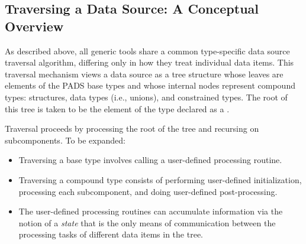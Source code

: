 \subsection{Traversing a Data Source: A Conceptual Overview}
\label{sec:gen-tool-traversal}
As described above, all generic tools share a common type-specific data source traversal algorithm, differing only in how they treat individual data items. This traversal mechanism views a data source as a tree structure whose leaves are elements of the PADS base types and whose internal nodes represent compound types: structures, data types (i.e., unions), and constrained types. The root of this tree is taken to be the element of the type declared as a .

Traversal proceeds by processing the root of the tree and recursing on subcomponents. To be expanded:
\begin{itemize}
\item Traversing a base type involves calling a user-defined processing routine.
\item Traversing a compound type consists of performing user-defined initialization, processing each subcomponent, and doing user-defined post-processing.
\item The user-defined processing routines can accumulate information via the notion of a \emph{state} that is the only means of communication between the processing tasks of different data items in the tree.
\end{itemize}

